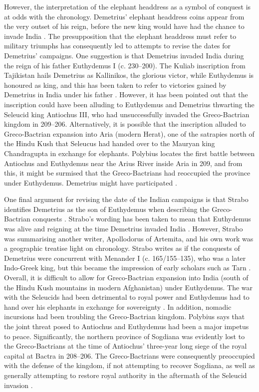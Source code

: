 \documentclass{ijsra}
\begin{document}
However, the interpretation of the elephant headdress as a symbol of conquest is at odds with the chronology.
Demetrius’ elephant headdress coins appear from the very outset of his reign, before the new king would have had the chance
to invade India \parencite[157]{Holt2012}.
The presupposition that the elephant headdress must refer to military triumphs has consequently led to attempts to revise the dates
for Demetrius’ campaigns.
One suggestion is that Demetrius invaded India during the reign of his father Euthydemus I (c. 230--200\BC).
The Kuliab inscription from Tajikistan hails Demetrius as Kallinikos, the glorious victor, while Euthydemus is honoured as king,
and this has been taken to refer to victories gained by Demetrius in India under his father \parencite[104--105]{MacDowall2007a}.
However, it has been pointed out that the inscription could have been alluding to Euthydemus and Demetrius thwarting the Seleucid king
Antiochus III, who had unsuccessfully invaded the Greco-Bactrian kingdom in 209--206\BC \parencite[48]{Bopearachchi2007}.
Alternatively, it is possible that the inscription alluded to Greco-Bactrian expansion into Aria (modern Herat),
one of the satrapies north of the Hindu Kush that Seleucus had handed over to the Mauryan king Chandragupta in exchange for elephants.
Polybius locates the first battle between Antiochus and Euthydemus near the Arius River inside Aria in 209\BC,
and from this, it might be surmised that the Greco-Bactrians had reoccupied the province under Euthydemus.
Demetrius might have participated \parencite[48]{Lerner1999}.

One final argument for revising the date of the Indian campaigns is that Strabo identifies Demetrius as the son of
Euthydemus when describing the Greco-Bactrian conquests \parencite[183]{Holt1999}.
Strabo’s wording has been taken to mean that Euthydemus was alive and reigning at the time Demetrius invaded India \parencite[157--158]{Holt2012}. 
However, Strabo was summarising another writer, Apollodorus of Artemita, and his own work was a geographic treatise light on chronology.
Strabo writes as if the conquests of Demetrius were concurrent with Menander I (c. 165/155--135\BC), who was a later Indo-Greek king,
but this became the impression of early scholars such as Tarn \parencite[144]{Tarn1951}.
Overall, it is difficult to allow for Greco-Bactrian expansion into India (south of the Hindu Kush mountains in modern Afghanistan)
under Euthydemus.
The war with the Seleucids had been detrimental to royal power and Euthydemus had to hand over his elephants in exchange for
sovereignty \parencite[130]{Holt1999}.
In addition, nomadic incursions had been troubling the Greco-Bactrian kingdom.
Polybius says that the joint threat posed to Antiochus and Euthydemus had been a major impetus to peace.
Significantly, the northern province of Sogdiana was evidently lost to the Greco-Bactrians at the time of Antiochus’
three-year long siege of the royal capital at Bactra in 208--206\BC \parencite[135]{Holt1999}.
The Greco-Bactrians were consequently preoccupied with the defense of the kingdom, if not attempting to recover Sogdiana,
as well as generally attempting to restore royal authority in the aftermath of the Seleucid invasion
\parencites[60--61]{Lerner1999}[236]{Widemann2000}.
\end{document}

